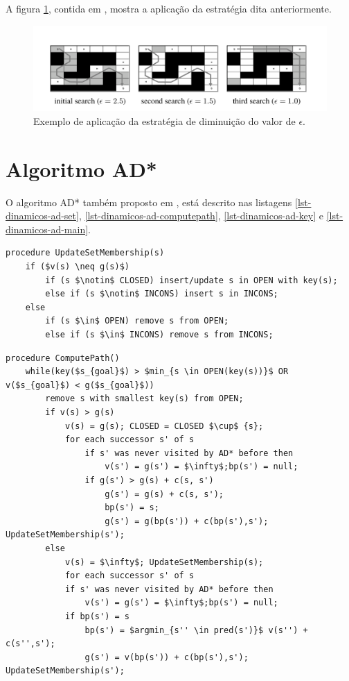 A figura \ref{fig-ara-exemplo}, contida em , mostra a aplicação da estratégia dita anteriormente.

\begin{figure}[H]
\centering
\includegraphics[width=.80\textwidth]{figuras/ara-3} 
\caption{Exemplo de aplicação da estratégia de diminuição do valor de $\epsilon$.}
\label{fig-ara-exemplo}
\end{figure}
\section{Algoritmo AD*}
\label{sec-dinamicos-ad}

O algoritmo AD* também proposto em , está descrito nas listagens \ref{lst-dinamicos-ad-set}, \ref{lst-dinamicos-ad-computepath}, \ref{lst-dinamicos-ad-key} e \ref{lst-dinamicos-ad-main}.

\begin{lstlisting}[mathescape, label=lst-dinamicos-ad-set, caption=Algoritmo AD* - função para determinar o conjunto ao qual vértice pertencerá, float=htpb]
procedure UpdateSetMembership(s)
	if ($v(s) \neq g(s)$)
		if (s $\notin$ CLOSED) insert/update s in OPEN with key(s);
		else if (s $\notin$ INCONS) insert s in INCONS;
	else
		if (s $\in$ OPEN) remove s from OPEN;
		else if (s $\in$ INCONS) remove s from INCONS;
\end{lstlisting}

\begin{lstlisting}[mathescape, label=lst-dinamicos-ad-computepath, caption=Algoritmo AD* - função de cálculo de caminho, float=htpb]
procedure ComputePath()
	while(key($s_{goal}$) > $min_{s \in OPEN(key(s))}$ OR v($s_{goal}$) < g($s_{goal}$)) 
		remove s with smallest key(s) from OPEN;
		if v(s) > g(s)
			v(s) = g(s); CLOSED = CLOSED $\cup$ {s};
			for each successor s' of s
				if s' was never visited by AD* before then
					v(s') = g(s') = $\infty$;bp(s') = null;
				if g(s') > g(s) + c(s, s')
					g(s') = g(s) + c(s, s');
					bp(s') = s;
					g(s') = g(bp(s')) + c(bp(s'),s'); UpdateSetMembership(s');
		else
			v(s) = $\infty$; UpdateSetMembership(s);
			for each successor s' of s
			if s' was never visited by AD* before then
				v(s') = g(s') = $\infty$;bp(s') = null;
			if bp(s') = s
				bp(s') = $argmin_{s'' \in pred(s')}$ v(s'') + c(s'',s');
				g(s') = v(bp(s')) + c(bp(s'),s'); UpdateSetMembership(s');
\end{lstlisting}

